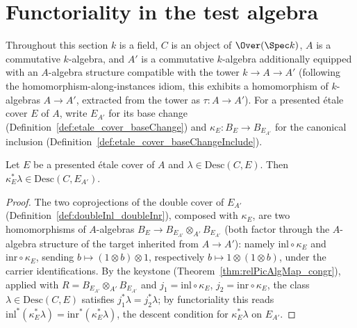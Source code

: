 \section{Functoriality in the test algebra}

Throughout this section \(k\) is a field, \(C\) is an object of \(\Over(\Spec k)\), \(A\) is a
commutative \(k\)-algebra, and \(A'\) is a commutative \(k\)-algebra additionally equipped with
an \(A\)-algebra structure compatible with the tower \(k \to A \to A'\) (following the
homomorphism-along-instances idiom, this exhibits a homomorphism of \(k\)-algebras \(A \to
A'\), extracted from the tower as \(\tau \colon A \to A'\)). For a presented \'etale cover \(E\)
of \(A\), write \(E_{A'}\) for its base change (Definition~\ref{def:etale_cover_baseChange}) and
\(\kappa_E \colon B_E \to B_{E_{A'}}\) for the canonical inclusion
(Definition~\ref{def:etale_cover_baseChangeInclude}).

\begin{lemma}
  \label{lem:baseChangeInclude_mem_descentClasses}
  \leanok
  Let \(E\) be a presented \'etale cover of \(A\) and \(\lambda \in \mathrm{Desc}(C,E)\). Then
  \(\kappa_E^{*}\lambda \in \mathrm{Desc}(C, E_{A'})\).
\end{lemma}
\begin{proof}
  \leanok
  The two coprojections of the double cover of \(E_{A'}\)
  (Definition~\ref{def:doubleInl_doubleInr}), composed with \(\kappa_E\), are two
  homomorphisms of \(A\)-algebras \(B_E \to B_{E_{A'}} \otimes_{A'} B_{E_{A'}}\) (both factor
  through the \(A\)-algebra structure of the target inherited from \(A \to A'\)): namely
  \(\mathrm{inl} \circ \kappa_E\) and \(\mathrm{inr} \circ \kappa_E\), sending \(b \mapsto
  (1 \otimes b) \otimes 1\), respectively \(b \mapsto 1 \otimes (1 \otimes b)\), under the
  carrier identifications. By the keystone (Theorem~\ref{thm:relPicAlgMap_congr}), applied with
  \(R = B_{E_{A'}} \otimes_{A'} B_{E_{A'}}\) and \(j_1 = \mathrm{inl} \circ \kappa_E\), \(j_2 =
  \mathrm{inr} \circ \kappa_E\), the class \(\lambda \in \mathrm{Desc}(C,E)\) satisfies
  \(j_1^{*}\lambda = j_2^{*}\lambda\); by functoriality this reads \(\mathrm{inl}^{*}
  (\kappa_E^{*}\lambda) = \mathrm{inr}^{*}(\kappa_E^{*}\lambda)\), the descent condition for
  \(\kappa_E^{*}\lambda\) on \(E_{A'}\).
\end{proof}

